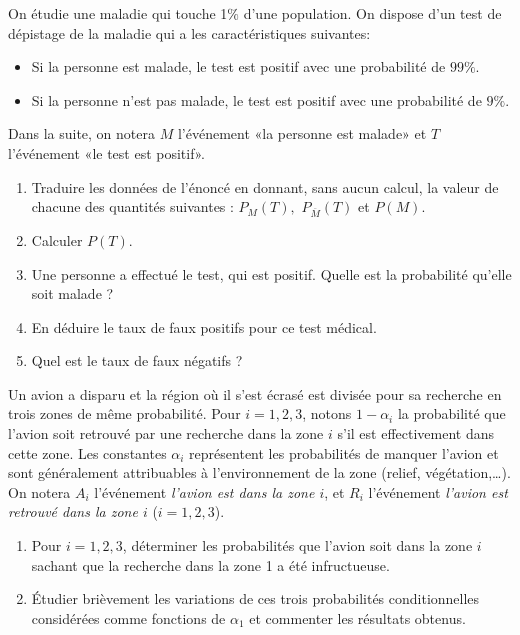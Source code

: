 \documentclass[a4paper,12pt,reqno]{amsart}
\begin{document}
\begin{exo}

  On étudie une maladie qui touche 1$\%$ d'une population. On dispose d'un test  de dépistage de la maladie qui a les caractéristiques suivantes:
  \begin{itemize}
    \item Si la personne est malade, le test est positif avec une probabilité de $99 \%$.
    \item Si la personne n'est pas malade, le test est positif avec une probabilité de $9 \%$.
  \end{itemize}
  Dans la suite, on notera $M$ l'événement «la personne est malade» et $T$ l'événement «le test est positif».

  \begin{enumerate}
    \item Traduire les données de l'énoncé en donnant, sans aucun calcul,  la valeur de chacune des quantités suivantes : $P_M(T),$ $P_{\overline M}(T)$ et $P(M)$.
    \item Calculer $P(T)$.
    \item Une personne a effectué le test, qui est positif. Quelle est la probabilité qu'elle soit malade ?
    \item En déduire le taux de faux positifs pour ce test médical.
    \item Quel est le taux de faux négatifs ?
  \end{enumerate}

\end{exo}

\begin{exo}

  Un avion a disparu et la région  où il s'est écrasé est divisée pour sa
  recherche en trois zones de même probabilité. Pour $i=1,2,3$, notons
  $1-\alpha_i$ la probabilité que l'avion soit retrouvé par une recherche
  dans la zone $i$ s'il est effectivement dans cette zone. Les constantes
  $\alpha_i$ représentent les probabilités de manquer l'avion et sont
  généralement attribuables à l'environnement de la zone (relief,
  végétation,\dots). On notera $A_i$ l'événement \emph{l'avion est dans la
  zone $i$}, et $R_i$ l'événement \emph{l'avion est retrouvé dans la zone
  $i$} ($i=1,2,3$).

  \begin{enumerate}
    \item  Pour $i=1,2,3$, déterminer les probabilités que l'avion soit dans la zone $i$ sachant que la recherche dans la zone 1 a été infructueuse.
    \item  Étudier brièvement les variations de ces trois probabilités conditionnelles considérées comme fonctions de $\alpha_1$ et commenter les résultats obtenus.
  \end{enumerate}

\end{exo}
\end{document}
